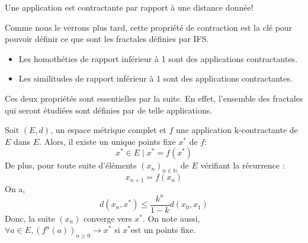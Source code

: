 \documentclass[a4paper, 12pt]{report}
\begin{document}
			\begin{remark*}
				Une application est contractante  par rapport à une distance donnée!
			\end{remark*}

			\hspace{.7 cm}Comme nous le verrons plus tard, cette propriété de contraction est la clé pour pouvoir définir ce que sont les fractales définies par IFS. 
			\begin{prop}
				\begin{itemize}
					\item Les homothéties de rapport inférieur à 1 sont des applications contractantes.
					\item Les similitudes de rapport inférieur à 1 sont des applications contractantes.
				\end{itemize}
			\end{prop}
			\hspace{.7 cm}Ces deux propriétés sont essentielles par la suite. En effet, l'ensemble des fractales qui seront étudiées sont définies par de telle applications.
			
			\begin{theorem}
				\label{ThmPtFixe}
				Soit $(E,d)$, un espace métrique complet et $f$ une application k-contractante de $E$ dans $E$. Alors, il existe un unique points fixe $x^*$ de $f$:
				\begin{equation*}
					x^*\in E\mid x^*=f(x^*)
				\end{equation*}
				De plus, pour toute suite d'éléments $(x_n)_{n\in\mathds{N}}$ de $E$ vérifiant la récurrence :
				\begin{equation*}
					x_{n+1}=f(x_n)
				\end{equation*}
				On a,
				\begin{equation}
					d(x_n,x^*)\leq \frac{k^n}{1-k} d(x_0,x_1)
				\end{equation}
				Donc, la suite $(x_n)$ converge vers $x^*$.
				On note aussi, $\forall a\in E,(f^n(a))_{n\geq 0}\longrightarrow x^*$ si $x^*$est un points fixe.
			\end{theorem}
\end{document}
